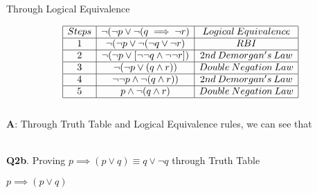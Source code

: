 \documentclass[12pt, letterpaper]{article}
\begin{document}
{\large\centerline{Through Logical Equivalence}}
\begin{displaymath}
    \begin{array}{|c|c|c|}
    \hline
    Steps & \neg(\neg p \lor \neg(q \implies \neg r) & Logical \: Equivalence \\ %
    \hline %
    1 & \neg(\neg p \lor \neg(\neg q \lor \neg r) & RBI\\
    \hline
    2 & \neg(\neg p \lor [\neg \neg q \land \neg \neg r]) & 2nd \: Demorgan's \: Law\\
    \hline
    3 & \neg(\neg p \lor (q \land r)) & Double \: Negation\: Law\\
    \hline
    4 & \neg \neg p \land \neg (q \land r)) & 2nd \: Demorgan's \: Law\\
    \hline
    5 & p \land \neg(q \land r) & Double \: Negation\: Law\\
    \hline
    \end{array}
\end{displaymath} \\

\textbf{A}: Through Truth Table and Logical Equivalence rules, we can see that

\setlength\parindent{40pt}{$\neg(\neg p \lor \neg(q \implies \neg r)$ and $(p \land \neg(q \land r)$ are both logically Equivalent} \\[2in]

\textbf{Q2b}. Proving $p \implies (p \lor q) \equiv q \lor \neg q$ through Truth Table\\

{\large\centerline{$p \implies (p \lor q)$}}
\end{document}
